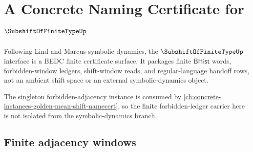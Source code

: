\chapter{A Concrete Naming Certificate for $\SubshiftOfFiniteTypeUp$}
\label{ch:concrete-instances-subshift-finite-type-namecert}

Following Lind and Marcus symbolic dynamics, the $\SubshiftOfFiniteTypeUp$ interface is a BEDC finite certificate surface. It packages finite $\mathsf{BHist}$ words, forbidden-window ledgers, shift-window reads, and regular-language handoff rows, not an ambient shift space or an external symbolic-dynamics object.

The singleton forbidden-adjacency instance is consumed by \autoref{ch:concrete-instances-golden-mean-shift-namecert}, so the finite forbidden-ledger carrier here is not isolated from the symbolic-dynamics branch.

\section{Finite adjacency windows}
\label{sec:subshift-finite-type-adjacency-windows}

